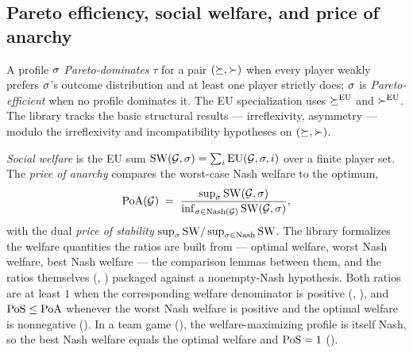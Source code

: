 
\subsection{Pareto efficiency, social welfare, and price of anarchy}
\label{sec:solution-concepts:welfare}

A profile $\sigma$ \emph{Pareto-dominates} $\tau$ for a pair
$(\succeq, \succ)$ when every player weakly prefers $\sigma$'s
outcome distribution and at least one player strictly does;
$\sigma$ is \emph{Pareto-efficient} when no profile dominates
it.  The EU specialization uses $\succeq^{\mathrm{EU}}$ and
$\succ^{\mathrm{EU}}$.  The library tracks the basic structural results
— irreflexivity, asymmetry — modulo the irreflexivity and
incompatibility hypotheses on $(\succeq, \succ)$.

\emph{Social welfare} is the EU sum
$\mathrm{SW}(\mathcal{G}, \sigma) = \sum_i \mathrm{EU}(\mathcal{G}, \sigma, i)$ over a
finite player set.  The \emph{price of anarchy}
\citep{Koutsoupias1999, Roughgarden2005} compares the
worst-case Nash welfare to the optimum,
\begin{equation}
\label{eq:poa}
  \mathrm{PoA}(\mathcal{G}) \;=\; \frac{\sup_{\sigma} \mathrm{SW}(\mathcal{G}, \sigma)}
                       {\inf_{\sigma \in \mathrm{Nash}(\mathcal{G})} \mathrm{SW}(\mathcal{G}, \sigma)},
\end{equation}
with the dual \emph{price of stability}
$\sup_{\sigma} \mathrm{SW} / \sup_{\sigma \in \mathrm{Nash}} \mathrm{SW}$.
The library formalizes the welfare quantities the ratios are built
from — optimal welfare, worst Nash welfare, best Nash welfare —
the comparison lemmas between them, and the ratios
themselves (, ) packaged
against a nonempty-Nash hypothesis.  Both ratios are at least $1$
when the corresponding welfare denominator is positive
(,
), and
$\mathrm{PoS} \le \mathrm{PoA}$ whenever the worst Nash welfare is positive and
the optimal welfare is nonnegative
().  In a team game
(), the welfare-maximizing
profile is itself Nash, so the best Nash welfare equals the
optimal welfare and $\mathrm{PoS} = 1$
().

